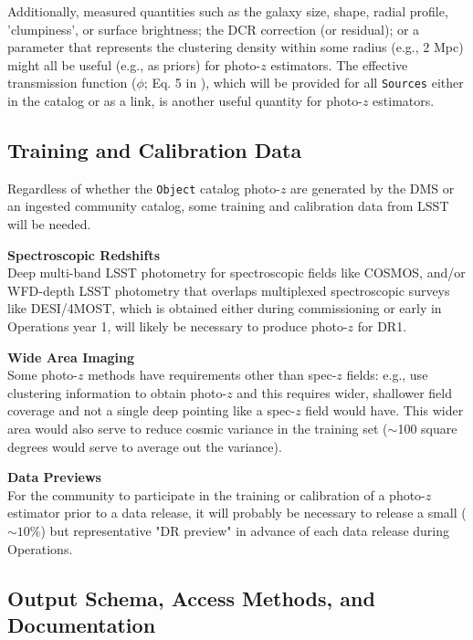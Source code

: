 \documentclass[DM,lsstdraft,toc]{lsstdoc}
\begin{document}
Additionally, measured quantities such as the galaxy size, shape, radial profile, 'clumpiness', or surface brightness; the DCR correction (or residual); or a parameter that represents the clustering density within some radius (e.g., 2 Mpc) might all be useful (e.g., as priors) for photo-$z$ estimators. The effective transmission function ($\phi$; Eq. 5 in ), which will be provided for all {\tt Sources} either in the catalog or as a link, is another useful quantity for photo-$z$ estimators.


\subsection{Training and Calibration Data}\label{ssec:dp_calib}

Regardless of whether the {\tt Object} catalog photo-$z$ are generated by the DMS or an ingested community catalog, some training and calibration data from LSST will be needed.

{\bf Spectroscopic Redshifts}\\
Deep multi-band LSST photometry for spectroscopic fields like COSMOS, and/or WFD-depth LSST photometry that overlaps multiplexed spectroscopic surveys like DESI/4MOST, which is obtained either during commissioning or early in Operations year 1, will likely be necessary to produce photo-$z$ for DR1.

{\bf Wide Area Imaging}\\
Some photo-$z$ methods have requirements other than spec-$z$ fields: e.g., \citet{2019MNRAS.483.2801S} use clustering information to obtain photo-$z$ and this requires wider, shallower field coverage and not a single deep pointing like a spec-$z$ field would have. 
This wider area would also serve to reduce cosmic variance in the training set ($\sim$100 square degrees would serve to average out the variance).

{\bf Data Previews}\\
For the community to participate in the training or calibration of a photo-$z$ estimator prior to a data release, it will probably be necessary to release a small ($\sim10\%$) but representative "DR preview" in advance of each data release during Operations.


\subsection{Output Schema, Access Methods, and Documentation}\label{ssec:dp_pz}
\end{document}
